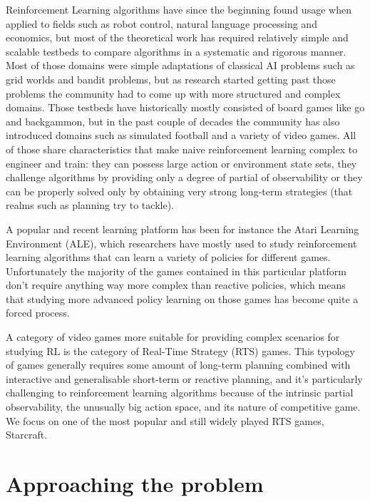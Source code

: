 Reinforcement Learning algorithms have since the beginning found usage when
applied to fields such as robot control, natural language processing and
economics, but most of the theoretical work has required relatively simple and
scalable testbeds to compare algorithms in a systematic and rigorous manner.
Most of those domains were simple adaptations of classical AI problems such as
grid worlds and bandit problems, but as research started getting past those
problems the community had to come up with more structured and complex domains.
Those testbeds have historically mostly consisted of board games like go and
backgammon, but in the past couple of decades the community has also introduced
domains such as simulated football and a variety of video games. All of those share
characteristics that make naive reinforcement learning complex to engineer and
train: they can possess large action or environment state sets, they challenge
algorithms by providing only a degree of partial of observability or they can be
properly solved only by obtaining very strong long-term strategies (that realms
such as planning try to tackle).


A popular and recent learning platform has been for instance the Atari Learning
Environment (ALE), which researchers have mostly used to study reinforcement
learning algorithms that can learn a variety of policies for different games.
Unfortunately the majority of the games contained in this particular
platform don't require anything way more complex than reactive policies, which
means that studying more advanced policy learning on those games has become
quite a forced process.

A category of video games more suitable for providing complex scenarios for
studying RL is the category of Real-Time Strategy (RTS) games. This typology of
games generally requires some amount of long-term planning combined with
interactive and generalisable short-term or reactive planning, and it's
particularly challenging to reinforcement learning algorithms because of the
intrinsic partial observability, the unusually big action space, and its nature
of competitive game. We focus on one of the most popular and still widely played
RTS games, Starcraft.


\section{Approaching the problem} %


